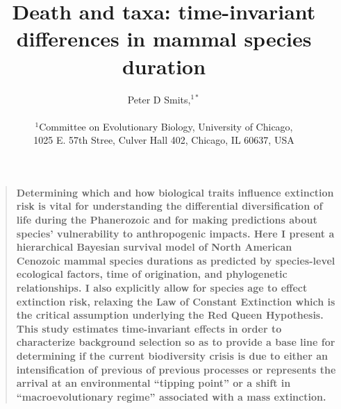 \documentclass[12pt]{article}
\title{Death and taxa: time-invariant differences in mammal species duration}
\author
{Peter D Smits,$^{1\ast}$\\
\\
\normalsize{$^{1}$Committee on Evolutionary Biology, University of Chicago,}\\
\normalsize{1025 E. 57th Stree, Culver Hall 402, Chicago, IL 60637, USA}\\
}
\date{}
\newenvironment{sciabstract}{%
\begin{quote} \bf}
{\end{quote}}
\begin{document}
 


\baselineskip24pt


\maketitle 
\linenumbers
\modulolinenumbers[2]


\begin{sciabstract}
  Determining which and how biological traits influence extinction risk is vital for understanding the differential diversification of life during the Phanerozoic and for making predictions about species' vulnerability to anthropogenic impacts. Here I present a hierarchical Bayesian survival model of North American Cenozoic mammal species durations as predicted by species-level ecological factors, time of origination, and phylogenetic relationships. I also explicitly allow for species age to effect extinction risk, relaxing the Law of Constant Extinction which is the critical assumption underlying the Red Queen Hypothesis. This study estimates time-invariant effects in order to characterize background selection so as to provide a base line for determining if the current biodiversity crisis is due to either an intensification of previous of previous processes or represents the arrival at an environmental ``tipping point'' or a shift in ``macroevolutionary regime'' associated with a mass extinction.
\end{sciabstract}

%
%
%
%
\end{document}
